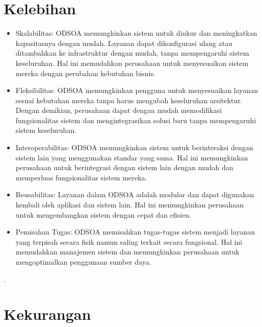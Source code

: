 \documentclass{article}
\begin{document}
	\section{Kelebihan}
	
	\begin{itemize}
		\item Skalabilitas: ODSOA memungkinkan sistem untuk diukur dan meningkatkan kapasitasnya dengan mudah. Layanan dapat dikonfigurasi ulang atau ditambahkan ke infrastruktur dengan mudah, tanpa mempengaruhi sistem keseluruhan. Hal ini memudahkan 					perusahaan untuk menyesuaikan sistem mereka dengan perubahan kebutuhan bisnis.
		\item Fleksibilitas: ODSOA memungkinkan pengguna untuk menyesuaikan layanan sesuai kebutuhan mereka tanpa harus mengubah keseluruhan arsitektur. Dengan demikian, perusahaan dapat dengan mudah memodifikasi fungsionalitas sistem dan mengintegrasikan 				solusi baru tanpa mempengaruhi sistem keseluruhan.
		\item Interoperabilitas: ODSOA memungkinkan sistem untuk berinteraksi dengan sistem lain yang menggunakan standar yang sama. Hal ini memungkinkan perusahaan untuk berintegrasi dengan sistem lain dengan mudah dan memperluas fungsionalitas sistem 					mereka.
		\item Reusabilitas: Layanan dalam ODSOA adalah modular dan dapat digunakan kembali oleh aplikasi dan sistem lain. Hal ini memungkinkan perusahaan untuk mengembangkan sistem dengan cepat dan efisien.
		\item Pemisahan Tugas: ODSOA memisahkan tugas-tugas sistem menjadi layanan yang terpisah secara fisik namun saling terkait secara fungsional. Hal ini memudahkan manajemen sistem dan memungkinkan perusahaan untuk mengoptimalkan penggunaan sumber 				daya.
	\end{itemize}
.
	
	
	\section{Kekurangan}
	
\end{document}

